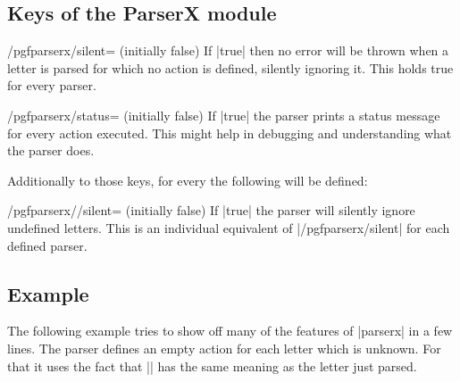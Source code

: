 \subsection{Keys of the ParserX module}\label{sec:parserx:keys}
\begin{key}{/pgfparserx/silent= (initially false)}
  If |true| then no error will be thrown when a letter is parsed for which no
  action is defined, silently ignoring it. This holds true for every parser.
\end{key}

\begin{key}{/pgfparserx/status= (initially false)}
  If |true| the parser prints a status message for every action executed. This
  might help in debugging and understanding what the parser does.
\end{key}

Additionally to those keys, for every  the following will be
defined:

\begin{key}
  {/pgfparserx//silent= (initially false)}
  If |true| the parser  will silently ignore undefined
  letters. This is an individual equivalent of |/pgfparserx/silent| for each
  defined parser.
\end{key}

\subsection{Example}
The following example tries to show off many of the features of |parserx| in a
few lines. The parser defines an empty action for each letter which is unknown.
For that it uses the fact that |\pgfparserxtoken| has the same meaning as the
letter just parsed.
